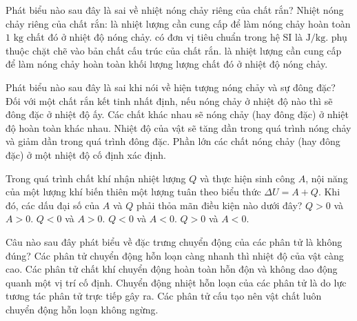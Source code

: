 \begin{ex}%
	Phát biểu nào sau đây là sai về nhiệt nóng chảy riêng của chất rắn? Nhiệt nóng chảy riêng của chất rắn:
	\choice
	{là nhiệt lượng cần cung cấp để làm nóng chảy hoàn toàn $1\text{ kg}$ chất đó ở nhiệt độ nóng chảy.}
	{có đơn vị tiêu chuẩn trong hệ SI là $\text{J/kg}$.}
	{phụ thuộc chặt chẽ vào bản chất cấu trúc của chất rắn.}
	{\True là nhiệt lượng cần cung cấp để làm nóng chảy hoàn toàn khối lượng lượng chất đó ở nhiệt độ nóng chảy.}
\end{ex}

\begin{ex}%
	Phát biểu nào sau đây là sai khi nói về hiện tượng nóng chảy và sự đông đặc?
	\choice
	{Đối với một chất rắn kết tinh nhất định, nếu nóng chảy ở nhiệt độ nào thì sẽ đông đặc ở nhiệt độ ấy.}
	{Các chất khác nhau sẽ nóng chảy (hay đông đặc) ở nhiệt độ hoàn toàn khác nhau.}
	{\True Nhiệt độ của vật sẽ tăng dần trong quá trình nóng chảy và giảm dần trong quá trình đông đặc.}
	{Phần lớn các chất nóng chảy (hay đông đặc) ở một nhiệt độ cố định xác định.}
\end{ex}

\begin{ex}%
	Trong quá trình chất khí nhận nhiệt lượng $Q$ và thực hiện sinh công $A$, nội năng của một lượng khí biến thiên một lượng tuân theo biểu thức $\Delta U = A + Q$. Khi đó, các dấu đại số của $A$ và $Q$ phải thỏa mãn điều kiện nào dưới đây?
	\choice
	{$Q>0$ và $A>0$.}
	{ $Q<0$ và $A>0$.}
	{$Q<0$ và $A<0$.}
	{\True $Q>0$ và $A<0$.}
\end{ex}

\begin{ex}%
	Câu nào sau đây phát biểu về đặc trưng chuyển động của các phân tử là không đúng?
	\choice
	{Các phân tử chuyển động hỗn loạn càng nhanh thì nhiệt độ của vật càng cao.}
	{Các phân tử chất khí chuyển động hoàn toàn hỗn độn và không dao động quanh một vị trí cố định.}
	{\True Chuyển động nhiệt hỗn loạn của các phân tử là do lực tương tác phân tử trực tiếp gây ra.}
	{Các phân tử cấu tạo nên vật chất luôn chuyển động hỗn loạn không ngừng.}
\end{ex}

